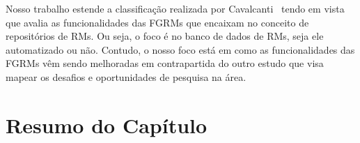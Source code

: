Nosso trabalho estende a classificação realizada por
Cavalcanti~\cite{cavalcanti2014challenges} tendo em vista que avalia as
funcionalidades das FGRMs que encaixam no conceito de repositórios de RMs. Ou
seja, o foco é no banco de dados de RMs, seja ele automatizado ou não. Contudo,
o nosso foco está em como as funcionalidades das FGRMs vêm sendo melhoradas em
contrapartida do outro estudo que visa mapear os desafios e oportunidades de
pesquisa na área.

\section{Resumo do Capítulo}
\label{sec:resumo_capitulo}